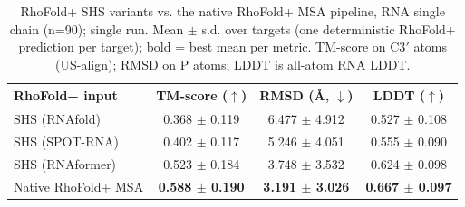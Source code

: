 \begin{table}[htbp]
\centering
\caption{RhoFold+ SHS variants vs. the native RhoFold+ MSA pipeline, RNA single chain (n=90); single run. Mean $\pm$ s.d. over targets (one deterministic RhoFold+ prediction per target); bold = best mean per metric. TM-score on C3$'$ atoms (US-align); RMSD on P atoms; LDDT is all-atom RNA LDDT.}
\label{tab:rf_rna_single_chain_native_msa}
\begin{tabular}{lccc}
\toprule
RhoFold+ input & TM-score ($\uparrow$) & RMSD (\AA, $\downarrow$) & LDDT ($\uparrow$) \\
\midrule
SHS (RNAfold) & 0.368 $\pm$ 0.119 & 6.477 $\pm$ 4.912 & 0.527 $\pm$ 0.108 \\
SHS (SPOT-RNA) & 0.402 $\pm$ 0.117 & 5.246 $\pm$ 4.051 & 0.555 $\pm$ 0.090 \\
SHS (RNAformer) & 0.523 $\pm$ 0.184 & 3.748 $\pm$ 3.532 & 0.624 $\pm$ 0.098 \\
Native RhoFold+ MSA & \textbf{0.588 $\pm$ 0.190} & \textbf{3.191 $\pm$ 3.026} & \textbf{0.667 $\pm$ 0.097} \\
\bottomrule
\end{tabular}
\end{table}
